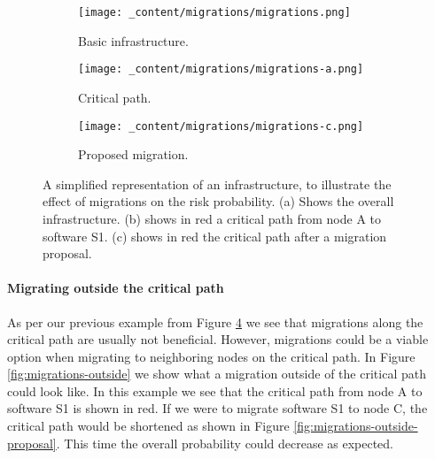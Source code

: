 \begin{figure}[H]
    \begin{subfigure}[b]{0.3\textwidth}
        \centering
        \texttt{[image: \_content/migrations/migrations.png]}
        \caption{Basic infrastructure.}
        \label{fig:migrations-infrastructure}
    \end{subfigure}
    \begin{subfigure}[b]{0.3\textwidth}
        \centering
        \texttt{[image: \_content/migrations/migrations-a.png]}
        \caption{Critical path.}
        \label{fig:migrations-basic}
    \end{subfigure}
    \begin{subfigure}[b]{0.3\textwidth}
        \centering
        \texttt{[image: \_content/migrations/migrations-c.png]}
        \caption{Proposed migration.}
        \label{fig:migrations-shortened}
    \end{subfigure}
    \caption{A simplified representation of an infrastructure, to illustrate the effect of migrations on the risk probability. (a) Shows the overall infrastructure. (b) shows in red a critical path from node A to software S1. (c) shows in red the critical path after a migration proposal.}
    \label{fig:migrations-example}
\end{figure}

\paragraph*{Migrating outside the critical path}
As per our previous example from Figure \ref{fig:migrations-example} we see that migrations along the critical path are usually not beneficial. However, migrations could be a viable option when migrating to neighboring nodes on the critical path. In Figure \ref{fig:migrations-outside} we show what a migration outside of the critical path could look like. In this example we see that the critical path from node A to software S1 is shown in red. If we were to migrate software S1 to node C, the critical path would be shortened as shown in Figure \ref{fig:migrations-outside-proposal}. This time the overall probability could decrease as expected.  

